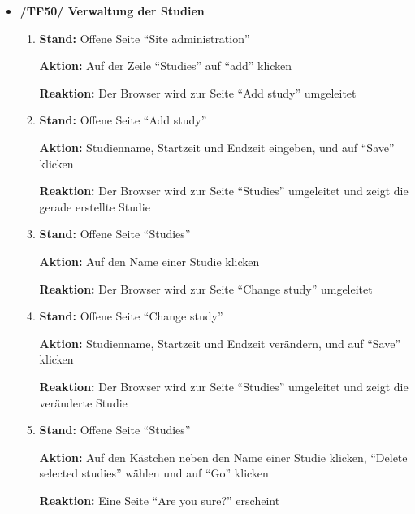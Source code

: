 \documentclass[a4paper]{scrreprt}
\begin{document}
\begin{itemize}
		                      \item \textbf{/TF50/ Verwaltung der Studien}
		                          \begin{enumerate}
		                              \item \par \textbf{Stand: }Offene Seite ``Site administration''
		                                    \par \textbf{Aktion: }Auf der Zeile ``Studies'' auf ``add'' klicken
		                                    \par \textbf{Reaktion: }Der Browser wird zur Seite ``Add study'' umgeleitet
		                              \item \par \textbf{Stand: }Offene Seite ``Add study''
		                                    \par \textbf{Aktion: }Studienname, Startzeit und Endzeit eingeben, und auf ``Save'' klicken
		                                    \par \textbf{Reaktion: }Der Browser wird zur Seite ``Studies'' umgeleitet und zeigt die gerade erstellte Studie
		                              \item \par \textbf{Stand: }Offene Seite ``Studies''
		                                    \par \textbf{Aktion: }Auf den Name einer Studie klicken
		                                    \par \textbf{Reaktion: }Der Browser wird zur Seite ``Change study'' umgeleitet  
		                              \item \par \textbf{Stand: }Offene Seite ``Change study''
		                                    \par \textbf{Aktion: }Studienname, Startzeit und Endzeit ver\"andern, und auf ``Save'' klicken
		                                    \par \textbf{Reaktion: }Der Browser wird zur Seite ``Studies'' umgeleitet und zeigt die ver\"anderte Studie 
		                              \item \par \textbf{Stand: }Offene Seite ``Studies''
		                                    \par \textbf{Aktion: }Auf den K\"astchen neben den Name einer Studie klicken, ``Delete selected studies'' w\"ahlen und auf ``Go'' klicken
		                                    \par \textbf{Reaktion: }Eine Seite ``Are you sure?'' erscheint 

\end{enumerate}
\end{itemize}
\end{document}
